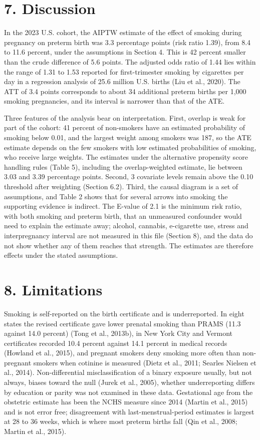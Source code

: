 \documentclass[11pt,letterpaper]{article}
\begin{document}
\section*{7. Discussion}

In the 2023 U.S. cohort, the AIPTW estimate of the effect of smoking during pregnancy on preterm birth was 3.3 percentage points (risk ratio 1.39), from 8.4 to 11.6 percent, under the assumptions in Section 4. This is 42 percent smaller than the crude difference of 5.6 points. The adjusted odds ratio of 1.44 lies within the range of 1.31 to 1.53 reported for first-trimester smoking by cigarettes per day in a regression analysis of 25.6 million U.S. births (Liu et al., 2020). The ATT of 3.4 points corresponds to about 34 additional preterm births per 1,000 smoking pregnancies, and its interval is narrower than that of the ATE.

Three features of the analysis bear on interpretation. First, overlap is weak for part of the cohort: 41 percent of non-smokers have an estimated probability of smoking below 0.01, and the largest weight among smokers was 187, so the ATE estimate depends on the few smokers with low estimated probabilities of smoking, who receive large weights. The estimates under the alternative propensity score handling rules (Table 5), including the overlap-weighted estimate, lie between 3.03 and 3.39 percentage points. Second, 3 covariate levels remain above the 0.10 threshold after weighting (Section 6.2). Third, the causal diagram is a set of assumptions, and Table 2 shows that for several arrows into smoking the supporting evidence is indirect. The E-value of 2.1 is the minimum risk ratio, with both smoking and preterm birth, that an unmeasured confounder would need to explain the estimate away; alcohol, cannabis, e-cigarette use, stress and interpregnancy interval are not measured in this file (Section 8), and the data do not show whether any of them reaches that strength. The estimates are therefore effects under the stated assumptions.

\section*{8. Limitations}

Smoking is self-reported on the birth certificate and is underreported. In eight states the revised certificate gave lower prenatal smoking than PRAMS (11.3 against 14.0 percent) (Tong et al., 2013b), in New York City and Vermont certificates recorded 10.4 percent against 14.1 percent in medical records (Howland et al., 2015), and pregnant smokers deny smoking more often than non-pregnant smokers when cotinine is measured (Dietz et al., 2011; Searles Nielsen et al., 2014). Non-differential misclassification of a binary exposure usually, but not always, biases toward the null (Jurek et al., 2005), whether underreporting differs by education or parity was not examined in these data. Gestational age from the obstetric estimate has been the NCHS measure since 2014 (Martin et al., 2015) and is not error free; disagreement with last-menstrual-period estimates is largest at 28 to 36 weeks, which is where most preterm births fall (Qin et al., 2008; Martin et al., 2015).
\end{document}
